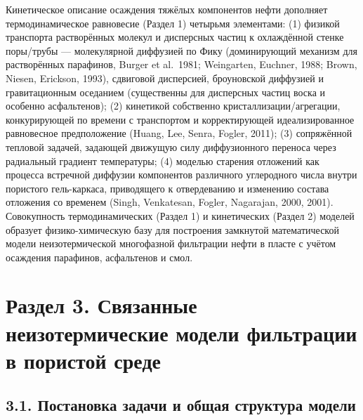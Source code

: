 \documentclass[11pt]{extarticle}
\begin{document}
Кинетическое описание осаждения тяжёлых компонентов нефти дополняет термодинамическое равновесие (Раздел 1) четырьмя элементами: (1) физикой транспорта растворённых молекул и дисперсных частиц к охлаждённой стенке поры/трубы --- молекулярной диффузией по Фику (доминирующий механизм для растворённых парафинов, Burger et al.~1981; Weingarten, Euchner, 1988; Brown, Niesen, Erickson, 1993), сдвиговой дисперсией, броуновской диффузией и гравитационным оседанием (существенны для дисперсных частиц воска и особенно асфальтенов); (2) кинетикой собственно кристаллизации/агрегации, конкурирующей по времени с транспортом и корректирующей идеализированное равновесное предположение (Huang, Lee, Senra, Fogler, 2011); (3) сопряжённой тепловой задачей, задающей движущую силу диффузионного переноса через радиальный градиент температуры; (4) моделью старения отложений как процесса встречной диффузии компонентов различного углеродного числа внутри пористого гель-каркаса, приводящего к отвердеванию и изменению состава отложения со временем (Singh, Venkatesan, Fogler, Nagarajan, 2000, 2001). Совокупность термодинамических (Раздел 1) и кинетических (Раздел 2) моделей образует физико-химическую базу для построения замкнутой математической модели неизотермической многофазной фильтрации нефти в пласте с учётом осаждения парафинов, асфальтенов и смол.

\newpage

\section{Раздел 3. Связанные неизотермические модели фильтрации в пористой среде}\label{ux440ux430ux437ux434ux435ux43b-3.-ux441ux432ux44fux437ux430ux43dux43dux44bux435-ux43dux435ux438ux437ux43eux442ux435ux440ux43cux438ux447ux435ux441ux43aux438ux435-ux43cux43eux434ux435ux43bux438-ux444ux438ux43bux44cux442ux440ux430ux446ux438ux438-ux432-ux43fux43eux440ux438ux441ux442ux43eux439-ux441ux440ux435ux434ux435}

\subsection{3.1. Постановка задачи и общая структура модели}\label{ux43fux43eux441ux442ux430ux43dux43eux432ux43aux430-ux437ux430ux434ux430ux447ux438-ux438-ux43eux431ux449ux430ux44f-ux441ux442ux440ux443ux43aux442ux443ux440ux430-ux43cux43eux434ux435ux43bux438}
\end{document}
